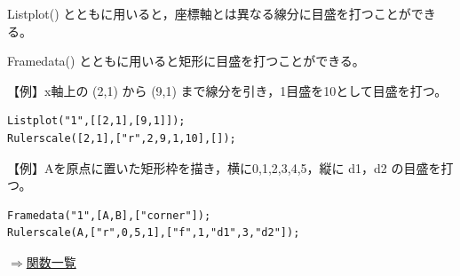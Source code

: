 \documentclass[papersize,a4paper,12pt,uplatex]{jsarticle}
\begin{document}
\begin{description}
Listplot() とともに用いると，座標軸とは異なる線分に目盛を打つことができる。

Framedata() とともに用いると矩形に目盛を打つことができる。

\vspace{\baselineskip}
【例】x軸上の (2,1) から (9,1) まで線分を引き，1目盛を10として目盛を打つ。
\begin{verbatim}
Listplot("1",[[2,1],[9,1]]);
Rulerscale([2,1],["r",2,9,1,10],[]);
\end{verbatim}
\vspace{\baselineskip}
\begin{center} \scalebox{0.9}{} \end{center}
\vspace{\baselineskip}

【例】Aを原点に置いた矩形枠を描き，横に0,1,2,3,4,5，縦に d1，d2 の目盛を打つ。
\begin{verbatim}
Framedata("1",[A,B],["corner"]);
Rulerscale(A,["r",0,5,1],["f",1,"d1",3,"d2"]);
\end{verbatim}
\begin{center}\scalebox{0.9}{ } \end{center}
\begin{flushright}\hyperlink{functionlist}{$\Rightarrow$関数一覧}\end{flushright}

\end{description}

\end{document}
